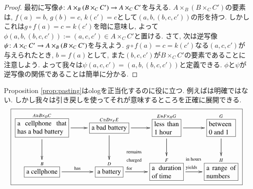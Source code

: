 \begin{proof}

 
最初に写像$\phi\colon A\times_B(B\times_CC')\rightarrow A\times_CC'$を与える. $A\times_B(B\times_CC')$の要素は, $f(a)=b$, $g(b)=c$, $k(c')=c$として$(a,b,(b,c,c'))$の形を持つ. しかしこれは$g\circ f(a)=c=k(c')$を暗に意味し, よって$\phi(a,b,(b,c,c')):=(a,c,c')\in A\times_CC'$と置ける. さて, 次は逆写像$\psi\colon A\times_CC'\rightarrow A\times_B(B\times_CC')$を与えよう. $g\circ f(a)=c=k(c')$なる$(a,c,c')$が与えられたとき, $b=f(a)$として, また$(b,c,c')$が$B\times_CC'$の要素であることに注意しよう. よって我々は$\psi(a,c,c')=(a,b,(b,c,c'))$と定義できる. $\phi$と$\psi$が逆写像の関係であることは簡単に分かる.
\end{proof}


Proposition \ref{prop:pasting}はologを正当化するのに役に立つ. 例えばは明確ではない. しかし我々は引き戻しを使ってそれが意味するところを正確に展開できる.
\small
\begin{align}\label{dia:bad battery}
\fbox{\xymatrixnocompile{\obox{A\iso B\times_DC}{1in}{a cellphone that has a bad battery}\ar[r]\ar[d]&\smbox{C\iso D\times_FE}{a bad battery}\ar[r]\ar[d]&\obox{E\iso F\times_HG}{.5in}{less than 1 hour}\ar[r]\ar[d]&\obox{G}{.5in}{between 0 and 1}\ar[d]\\\smbox{B}{a cellphone}\LA{r}{has}&\smbox{D}{a battery}\LA{r}{\parbox{.4in}{\rr remains charged for}}&\obox{F}{.6in}{a duration of time}\LA{r}{\hspace{.07in}\parbox{.4in}{\rr in hours yields}}&\obox{H}{.6in}{a range of numbers}}}
\end{align}\normalsize

